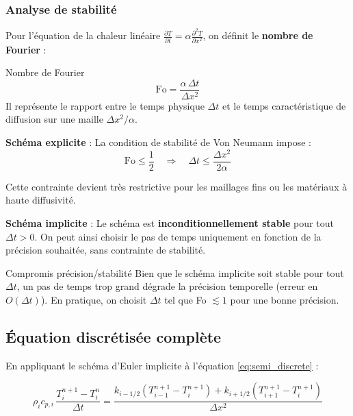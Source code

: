 \documentclass[11pt,a4paper]{article}
\begin{document}
\subsubsection{Analyse de stabilité}

Pour l'équation de la chaleur linéaire $\frac{\partial T}{\partial t} = \alpha \frac{\partial^2 T}{\partial x^2}$, on définit le \textbf{nombre de Fourier} :

\begin{definition}{Nombre de Fourier}{}
\begin{equation}
\text{Fo} = \frac{\alpha \, \Delta t}{\Delta x^2}
\end{equation}
Il représente le rapport entre le temps physique $\Delta t$ et le temps caractéristique de diffusion sur une maille $\Delta x^2/\alpha$.
\end{definition}

\textbf{Schéma explicite} : La condition de stabilité de Von Neumann impose :
\begin{equation}
\text{Fo} \leq \frac{1}{2} \quad \Rightarrow \quad \Delta t \leq \frac{\Delta x^2}{2\alpha}
\end{equation}

Cette contrainte devient très restrictive pour les maillages fins ou les matériaux à haute diffusivité.

\textbf{Schéma implicite} : Le schéma est \textbf{inconditionnellement stable} pour tout $\Delta t > 0$. On peut ainsi choisir le pas de temps uniquement en fonction de la précision souhaitée, sans contrainte de stabilité.

\begin{remarque}{Compromis précision/stabilité}{}
Bien que le schéma implicite soit stable pour tout $\Delta t$, un pas de temps trop grand dégrade la précision temporelle (erreur en $O(\Delta t)$). En pratique, on choisit $\Delta t$ tel que Fo $\lesssim 1$ pour une bonne précision.
\end{remarque}

\subsection{Équation discrétisée complète}

En appliquant le schéma d'Euler implicite à l'équation \eqref{eq:semi_discrete} :

\begin{tcolorbox}[colback=red!5,colframe=rouge,title=\textbf{Équation discrétisée (nœuds intérieurs)}]
\begin{equation}
\rho_i c_{p,i} \, \frac{T_i^{n+1} - T_i^n}{\Delta t} = \frac{k_{i-1/2}(T_{i-1}^{n+1} - T_i^{n+1}) + k_{i+1/2}(T_{i+1}^{n+1} - T_i^{n+1})}{\Delta x^2}
\label{eq:discrete}
\end{equation}
\end{tcolorbox}
\end{document}
